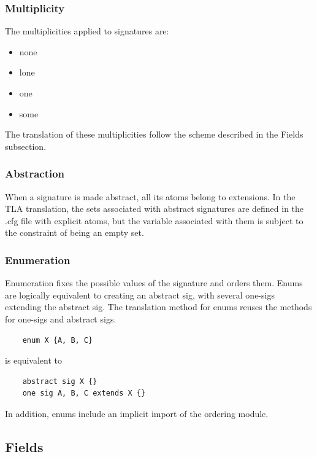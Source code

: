 \subsubsection{Multiplicity}

The multiplicities applied to signatures are:

\begin{itemize}
	\item none
	\item lone
	\item one
	\item some
\end{itemize}

The translation of these multiplicities follow the scheme described in the Fields subsection.

\subsubsection{Abstraction}

When a signature is made abstract, all its atoms belong to extensions. In the TLA translation, the sets associated with abstract signatures are defined in the .cfg file with explicit atoms, but the variable associated with them is subject to the constraint of being an empty set.

\subsubsection{Enumeration}

Enumeration fixes the possible values of the signature and orders them. Enums are logically equivalent to creating an abstract sig, with several one-sigs extending the abstract sig. The translation method for enums reuses the methods for one-sigs and abstract sigs.


\begin{verbatim}
	enum X {A, B, C}
\end{verbatim}

is equivalent to

\begin{verbatim}
	abstract sig X {}
	one sig A, B, C extends X {}
\end{verbatim}

In addition, enums include an implicit import of the ordering module.


\subsection{Fields}

